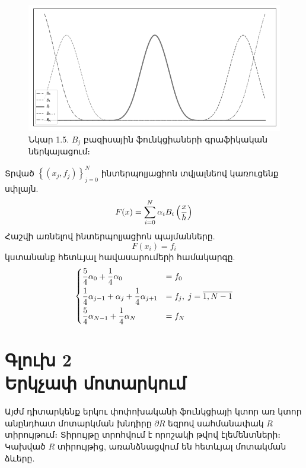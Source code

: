 \documentclass[fleqn, bachelor,subf,12pt,notitlepage]{article}
\begin{document}
\begin{figure}[h!]
\centering
\includegraphics[width=1.0\textwidth]{images/all_cubic_compact_support_basis}
\captionsetup{labelformat=empty}
\caption{\hfill Նկար 1.5. $B_{j}$ բազիսային ֆունկցիաների գրաֆիկական ներկայացում։}
\end{figure}
Տրված $\left\{\left(x_{j}, f_{j}\right)\right\}_{j=0}^{N}$ ինտերպոլյացիոն տվյալնեով կառուցենք սփլայն.
\begin{equation}
F(x) = \sum_{i=0}^{N} \alpha_{i}B_{i}\left(\frac{x}{h}\right)$$
\end{equation}
Հաշվի առնելով ինտերպոլյացիոն պայմանները.
\begin{equation*}
F(x_{i}) = f_{i}
\end{equation*}
կստանանք հետևյալ հավասարումերի համակարգը.
\begin{equation}
\begin{dcases}
\frac{5}{4}\alpha_{0} + \frac{1}{4}\alpha_{0} &= f_{0}\\
\frac{1}{4}\alpha_{j-1} + \alpha_{j} + \frac{1}{4}\alpha_{j+1} &= f_{j}, \; j=\overline{1, N-1}\\
\frac{5}{4}\alpha_{N-1} + \frac{1}{4}\alpha_{N} &= f_{N}\\
\end{dcases}
\end{equation}
\newpage
\section*{\centering Գլուխ 2 \\ Երկչափ մոտարկում}
\setcounter{equation}{0}
Այժմ դիտարկենք երկու փոփոխականի ֆունկցիայի կտոր առ կտոր անընդհատ մոտարկման խնդիրը $\partial R$ եզրով սահմանափակ $R$ տիրույթում։ Տիրույթը տրոհվում է որոշակի թվով էլեմենտների։ Կախված $R$ տիրույթից, առանձնացվում են հետևյալ մոտակման ձևերը.
\end{document}
